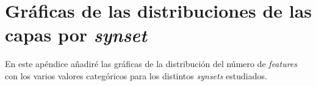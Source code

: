 \documentclass[12,twoside]{TFG-GM}
\theoremstyle{definition}
\theoremstyle{remark}
\begin{document}
\appendix
\vfill\newpage 
\section{Gráficas de las distribuciones de las capas por \textit{synset}} \label{apendice}
En este apéndice añadiré las gráficas de la distribución del número de \textit{features} con los varios valores categóricos para los distintos \textit{synsets} estudiados.
\end{document}
